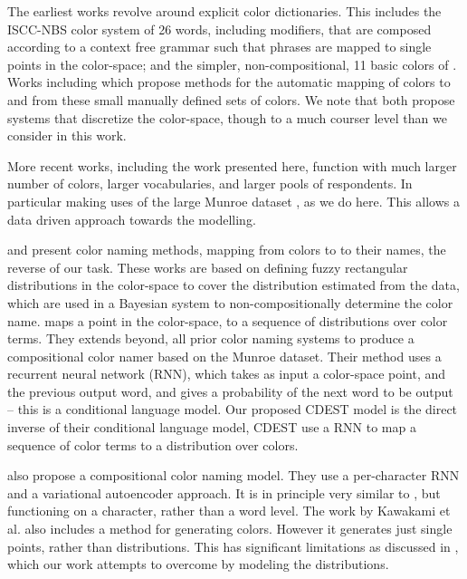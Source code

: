 \documentclass[11pt,a4paper]{article}
\newcommand{\parencite}{\citep}
\newcommand{\textcite}{\citet}
\begin{document}
The earliest works revolve around explicit color dictionaries.
This includes the ISCC-NBS color system \parencite{kelly1955iscc} of 26 words, including modifiers, that are composed according to a context free grammar such that phrases are mapped to single points in the color-space;
and the simpler, non-compositional, 11 basic colors of \textcite{berlin1969basic}.
Works including \textcite{Berk:1982:HFS:358589.358606,conway1992experimental,ele1994computational, mojsilovic2005computational, menegaz2007discrete,van2009learning} which propose methods for the automatic mapping of colors to and from these small manually defined sets of colors.
We note that \textcite{menegaz2007discrete,van2009learning} both propose systems that discretize the color-space, though to a much courser level than we consider in this work.


More recent works, including the work presented here, function with much larger number of colors, larger vocabularies, and larger pools of respondents.
In particular making uses of the large Munroe dataset \textcite{Munroe2010XKCDdataset}, as we do here.
This allows a data driven approach towards the modelling.

\textcite{mcmahan2015bayesian} and \textcite{meomcmahanstone:color} present color naming methods, mapping from colors to to their names, the reverse of our task.
These works are based on defining fuzzy rectangular distributions in the color-space to cover the distribution estimated from the data, which are used in a Bayesian system to non-compositionally determine the color name.
%
%
\textcite{2016arXiv160603821M} maps a point in the color-space, to a sequence of distributions over color terms.
They extends beyond, all prior color naming systems to produce a compositional color namer based on the Munroe dataset.
Their method uses a recurrent neural network (RNN), which takes as input a color-space point, and the previous output word, and gives a probability of the next word to be output -- this is a conditional language model.
Our proposed CDEST model is the direct inverse of their conditional language model,
CDEST use a RNN to map a sequence of color terms to a distribution over colors.


\textcite{DBLP:journals/corr/KawakamiDRS16} also propose a compositional color naming model.
They use a per-character RNN and a variational autoencoder approach.
It is in principle very similar to \textcite{2016arXiv160603821M}, but functioning on a character, rather than a word level.
The work by Kawakami et al. also includes a method for generating colors.
However it generates just single points, rather than distributions.
This has significant limitations as discussed in , which our work attempts to overcome by modeling the distributions.
\end{document}
